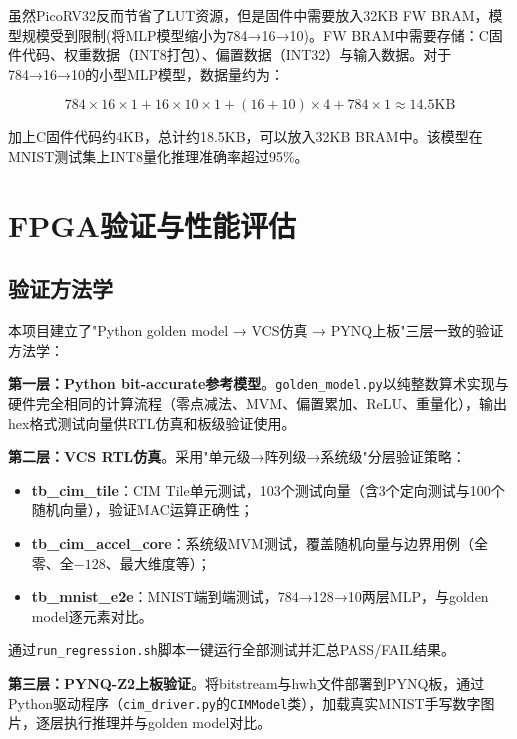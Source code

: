 \documentclass[12pt, a4paper]{article}
\begin{document}
虽然PicoRV32反而节省了LUT资源，但是固件中需要放入32KB FW BRAM，模型规模受到限制(将MLP模型缩小为784→16→10)。FW BRAM中需要存储：C固件代码、权重数据（INT8打包）、偏置数据（INT32）与输入数据。对于784→16→10的小型MLP模型，数据量约为：

\begin{equation}
	784 \times 16 \times 1 + 16 \times 10 \times 1 + (16 + 10) \times 4 + 784 \times 1 \approx 14.5\text{KB}
\end{equation}

加上C固件代码约4KB，总计约18.5KB，可以放入32KB BRAM中。该模型在MNIST测试集上INT8量化推理准确率超过95\%。

\section{FPGA验证与性能评估}

\subsection{验证方法学}

本项目建立了"Python golden model → VCS仿真 → PYNQ上板"三层一致的验证方法学：

\textbf{第一层：Python bit-accurate参考模型}。\texttt{golden\_model.py}以纯整数算术实现与硬件完全相同的计算流程（零点减法、MVM、偏置累加、ReLU、重量化），输出hex格式测试向量供RTL仿真和板级验证使用。

\textbf{第二层：VCS RTL仿真}。采用"单元级→阵列级→系统级"分层验证策略：
\begin{itemize}
	\item \textbf{tb\_cim\_tile}：CIM Tile单元测试，103个测试向量（含3个定向测试与100个随机向量），验证MAC运算正确性；
	\item \textbf{tb\_cim\_accel\_core}：系统级MVM测试，覆盖随机向量与边界用例（全零、全$-128$、最大维度等）；
	\item \textbf{tb\_mnist\_e2e}：MNIST端到端测试，784→128→10两层MLP，与golden model逐元素对比。
\end{itemize}

通过\texttt{run\_regression.sh}脚本一键运行全部测试并汇总PASS/FAIL结果。

\textbf{第三层：PYNQ-Z2上板验证}。将bitstream与hwh文件部署到PYNQ板，通过Python驱动程序（\texttt{cim\_driver.py}的\texttt{CIMModel}类），加载真实MNIST手写数字图片，逐层执行推理并与golden model对比。
\end{document}
